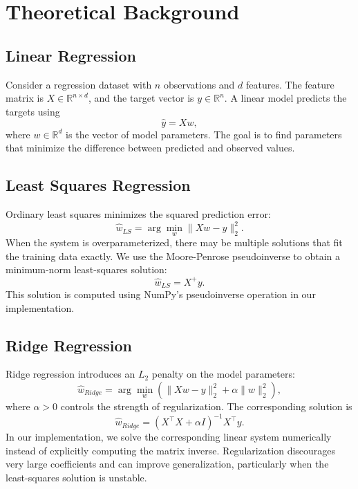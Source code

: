 \documentclass[11pt,a4paper]{article}
\begin{document}
\section{Theoretical Background}

\subsection{Linear Regression}
Consider a regression dataset with $n$ observations
and $d$ features.
The feature matrix is
$X \in \mathbb{R}^{n \times d}$,
and the target vector is
$y \in \mathbb{R}^{n}$.
A linear model predicts the targets using
\begin{equation}
    \hat{y} = Xw,
\end{equation}
where $w \in \mathbb{R}^{d}$ is the vector of
model parameters.
The goal is to find parameters that minimize the
difference between predicted and observed values.

\subsection{Least Squares Regression}
Ordinary least squares minimizes the squared
prediction error:
\begin{equation}
    \hat{w}_{LS}
    =
    \arg\min_w
    \|Xw-y\|_2^2.
\end{equation}
When the system is overparameterized, there may be
multiple solutions that fit the training data exactly.
We use the Moore-Penrose pseudoinverse to obtain
a minimum-norm least-squares solution:
\begin{equation}
    \hat{w}_{LS} = X^{+}y.
\end{equation}
This solution is computed using NumPy's pseudoinverse
operation in our implementation.

\subsection{Ridge Regression}
Ridge regression introduces an $L_2$ penalty on
the model parameters:
\begin{equation}
    \hat{w}_{Ridge}
    =
    \arg\min_w
    \left(
    \|Xw-y\|_2^2
    +
    \alpha \|w\|_2^2
    \right),
\end{equation}
where $\alpha > 0$ controls the strength of
regularization.
The corresponding solution is
\begin{equation}
    \hat{w}_{Ridge}
    =
    (X^\top X + \alpha I)^{-1}X^\top y.
\end{equation}
In our implementation, we solve the corresponding
linear system numerically instead of explicitly
computing the matrix inverse.
Regularization discourages very large coefficients
and can improve generalization, particularly when
the least-squares solution is unstable.
\end{document}
